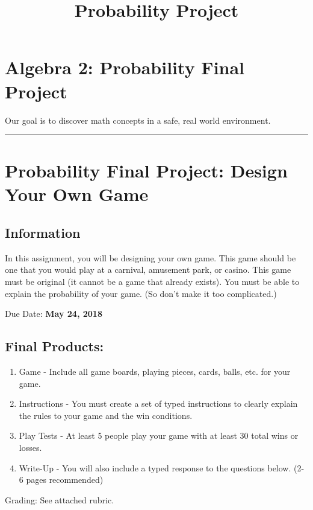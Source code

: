 \documentclass[11pt]{article}
\begin{document}
\title{Probability Project}
\section*{Algebra 2: Probability Final Project}

Our goal is to discover math concepts in a safe, real world environment.
\bigskip
\hrule
\section*{Probability Final Project: Design Your Own Game}
\subsection*{Information}
In this assignment, you will be designing your own game.  This game should be one that you would play at a carnival, amusement park, or casino.  This game must be original (it cannot be a game that already exists).  You must be able to explain the probability of your game. (So don't make it too complicated.)
\par
Due Date: \textbf{May 24, 2018}
\subsection*{Final Products:}
\begin{enumerate}
\item Game - Include all game boards, playing pieces, cards, balls, etc. for your game.
\item Instructions - You must create a set of typed instructions to clearly explain the rules to your game and the win conditions.
\item Play Tests - At least 5 people play your game with at least 30 total wins or losses.
\item Write-Up - You will also include a typed response to the questions below. (2-6 pages recommended)
\end{enumerate}
Grading: See attached rubric.
\end{document}
